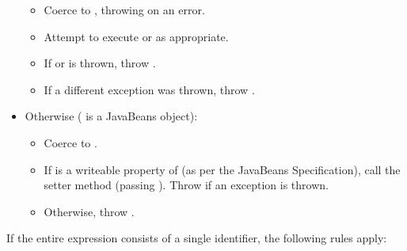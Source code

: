\begin{itemize}
\begin{itemize}
\item \foreignlanguage{english}{Coerce
}\foreignlanguage{english}{
to
}\foreignlanguage{english}{,
throwing
}\foreignlanguage{english}{
on an error. }
\item \foreignlanguage{english}{Attempt to execute
}\foreignlanguage{english}{ or
}\foreignlanguage{english}{ as appropriate. }
\item \foreignlanguage{english}{If
}\foreignlanguage{english}{or
}\foreignlanguage{english}{
is thrown, throw
}\foreignlanguage{english}{.
}
\item \foreignlanguage{english}{If a different exception was thrown,
throw
}\foreignlanguage{english}{.
\newline
}
\end{itemize}
\item \foreignlanguage{english}{Otherwise
(}\foreignlanguage{english}{
is a JavaBeans object): }

\begin{itemize}
\item \foreignlanguage{english}{Coerce
}\foreignlanguage{english}{
to
}\foreignlanguage{english}{.
}
\item \foreignlanguage{english}{If
}\foreignlanguage{english}{
is a writeable property of
}\foreignlanguage{english}{
(as per the JavaBeans Specification), call the setter method (passing
}\foreignlanguage{english}{).
}Throw if an
exception is thrown. 
\item Otherwise, throw
. \newline
\textstylespv{~}
\end{itemize}
\end{itemize}
\foreignlanguage{english}{If the entire expression consists of a single
identifier, the following rules apply:}

